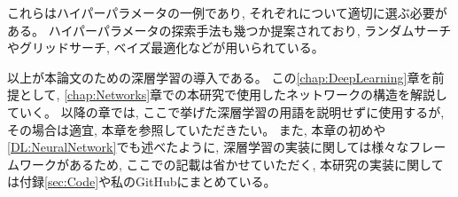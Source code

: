 これらはハイパーパラメータの一例であり, それぞれについて適切に選ぶ必要がある。
ハイパーパラメータの探索手法も幾つか提案されており, ランダムサーチやグリッドサーチ, ベイズ最適化などが用いられている。

以上が本論文のための深層学習の導入である。
この\ref{chap:DeepLearning}章を前提として, \ref{chap:Networks}章での本研究で使用したネットワークの構造を解説していく。
以降の章では, ここで挙げた深層学習の用語を説明せずに使用するが, その場合は適宜, 本章を参照していただきたい。
また, 本章の初めや\ref{DL:NeuralNetwork}でも述べたように, 深層学習の実装に関しては様々なフレームワークがあるため, ここでの記載は省かせていただく, 本研究の実装に関しては付録\ref{sec:Code}や私のGitHub\cite{GitHubGotoK}にまとめている。















